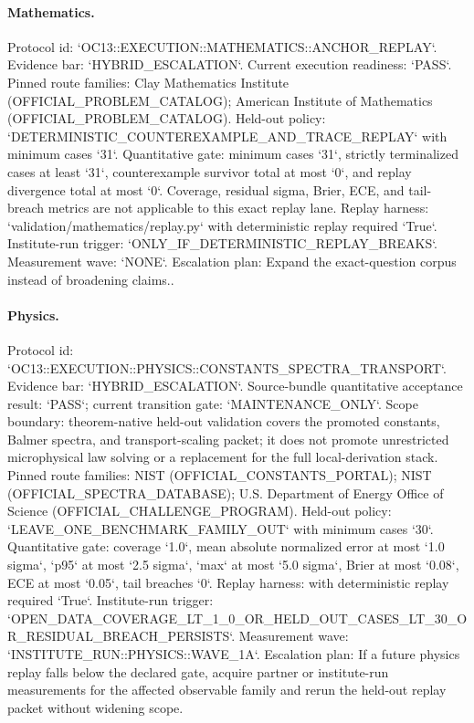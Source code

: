 \paragraph{Mathematics.}
Protocol id: `OC13::EXECUTION::MATHEMATICS::ANCHOR\_REPLAY`. Evidence bar: `HYBRID\_ESCALATION`. Current execution readiness: `PASS`.
Pinned route families: Clay Mathematics Institute (OFFICIAL\_PROBLEM\_CATALOG); American Institute of Mathematics (OFFICIAL\_PROBLEM\_CATALOG).
Held-out policy: `DETERMINISTIC\_COUNTEREXAMPLE\_AND\_TRACE\_REPLAY` with minimum cases `31`.
Quantitative gate: minimum cases `31`, strictly terminalized cases at least `31`, counterexample survivor total at most `0`, and replay divergence total at most `0`. Coverage, residual sigma, Brier, ECE, and tail-breach metrics are not applicable to this exact replay lane.
Replay harness: `validation/mathematics/replay.py` with deterministic replay required `True`.
Institute-run trigger: `ONLY\_IF\_DETERMINISTIC\_REPLAY\_BREAKS`. Measurement wave: `NONE`.
Escalation plan: Expand the exact-question corpus instead of broadening claims..

\paragraph{Physics.}
Protocol id: `OC13::EXECUTION::PHYSICS::CONSTANTS\_SPECTRA\_TRANSPORT`. Evidence bar: `HYBRID\_ESCALATION`. Source-bundle quantitative acceptance result: `PASS`; current transition gate: `MAINTENANCE\_ONLY`. Scope boundary: theorem-native held-out validation covers the promoted constants, Balmer spectra, and transport-scaling packet; it does not promote unrestricted microphysical law solving or a replacement for the full local-derivation stack.
Pinned route families: NIST (OFFICIAL\_CONSTANTS\_PORTAL); NIST (OFFICIAL\_SPECTRA\_DATABASE); U.S. Department of Energy Office of Science (OFFICIAL\_CHALLENGE\_PROGRAM).
Held-out policy: `LEAVE\_ONE\_BENCHMARK\_FAMILY\_OUT` with minimum cases `30`.
Quantitative gate: coverage `1.0`, mean absolute normalized error at most `1.0 sigma`, `p95` at most `2.5 sigma`, `max` at most `5.0 sigma`, Brier at most `0.08`, ECE at most `0.05`, tail breaches `0`.
Replay harness:  with deterministic replay required `True`.
Institute-run trigger: `OPEN\_DATA\_COVERAGE\_LT\_1\_0\_OR\_HELD\_OUT\_CASES\_LT\_30\_OR\_RESIDUAL\_BREACH\_PERSISTS`. Measurement wave: `INSTITUTE\_RUN::PHYSICS::WAVE\_1A`.
Escalation plan: If a future physics replay falls below the declared gate, acquire partner or institute-run measurements for the affected observable family and rerun the held-out replay packet without widening scope.

